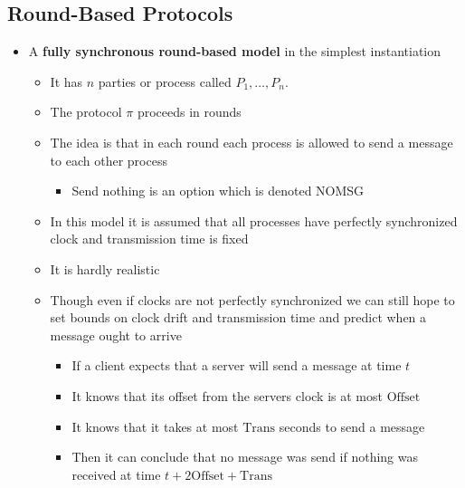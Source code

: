 \documentclass[11pt]{article}
\begin{document}
\subsection{Round-Based Protocols}
\label{sec:orgd36e92e}
\begin{itemize}
\item A \textbf{fully synchronous round-based model} in the simplest instantiation
\begin{itemize}
\item It has \(n\) parties or process called \(P_1,\dots,P_n\).
\item The protocol \(\pi\) proceeds in rounds
\item The idea is that in each round each process is allowed to send a message to each other process
\begin{itemize}
\item Send nothing is an option which is denoted NOMSG
\end{itemize}
\item In this model it is assumed that all processes have perfectly synchronized clock and transmission time is fixed
\item It is hardly realistic
\item Though even if clocks are not perfectly synchronized we can still hope to set bounds on clock drift and transmission time and predict when a message ought to arrive
\begin{itemize}
\item If a client expects that a server will send a message at time \(t\)
\item It knows that its offset from the servers clock is at most \(\text{Offset}\)
\item It knows that it takes at most \(\text{Trans}\) seconds to send a message
\item Then it can conclude that no message was send if nothing was received at time \(t + 2\text{Offset} + \text{Trans}\)
\end{itemize}
\end{itemize}


\end{itemize}
\end{document}
